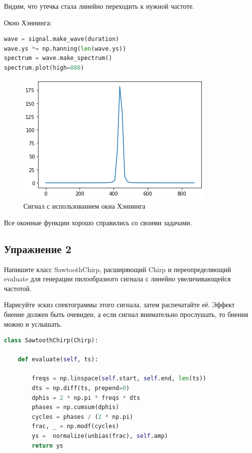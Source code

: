 Видим, что утечка стала линейно переходить к нужной частоте.

Окно Хэннинга:
\begin{lstlisting}[language=Python]
wave = signal.make_wave(duration)
wave.ys *= np.hanning(len(wave.ys))
spectrum = wave.make_spectrum()
spectrum.plot(high=880)
\end{lstlisting}
\begin{figure}[H]
	\begin{center}
		\includegraphics[scale=1]{fig/lab03/lab3_5.png}
		\caption{Сигнал с использованием окна Хэннинга}
	\end{center}
\end{figure}

Все оконные функции хорошо справились со своими задачами.
\subsection{Упражнение 2}


Напишите класс SawtoothChirp, расширяющий Chirp и переопределяющий evaluate для генерации пилообразного сигнала с линейно увеличивающейся частотой.

\noindent Нарисуйте эскиз спектограммы этого сигнала, затем распечатайте её. Эффект биение должен быть очевиден, а если сигнал внимательно прослушать, то биения можно и услышать.

\begin{lstlisting}[language=Python]
class SawtoothChirp(Chirp):

    def evaluate(self, ts):
        
        freqs = np.linspace(self.start, self.end, len(ts))
        dts = np.diff(ts, prepend=0)
        dphis = 2 * np.pi * freqs * dts
        phases = np.cumsum(dphis)
        cycles = phases / (2 * np.pi)
        frac, _ = np.modf(cycles)
        ys =  normalize(unbias(frac), self.amp)
        return ys
\end{lstlisting}

